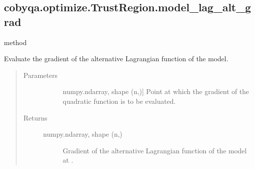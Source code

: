 \documentclass[letterpaper,10pt,english]{sphinxmanual}
\begin{document}
\begin{fulllineitems}
\begin{fulllineitems}
\begin{quote}
\begin{description}
\begin{description}
\end{description}

\end{description}\end{quote}

\end{fulllineitems}



\subsection{cobyqa.optimize.TrustRegion.model\_lag\_alt\_grad}
\label{\detokenize{refs/generated/cobyqa.optimize.TrustRegion.model_lag_alt_grad:cobyqa-optimize-trustregion-model-lag-alt-grad}}\label{\detokenize{refs/generated/cobyqa.optimize.TrustRegion.model_lag_alt_grad::doc}}
\sphinxAtStartPar
method

\begin{fulllineitems}
\label{\detokenize{refs/generated/cobyqa.optimize.TrustRegion.model_lag_alt_grad:cobyqa.optimize.TrustRegion.model_lag_alt_grad}}
\sphinxAtStartPar
Evaluate the gradient of the alternative Lagrangian function of the
model.
\begin{quote}\begin{description}
\item[{Parameters}] \leavevmode\begin{description}
\item[{}] \leavevmode{[}numpy.ndarray, shape (n,){]}
\sphinxAtStartPar
Point at which the gradient of the quadratic function is to be
evaluated.

\end{description}

\item[{Returns}] \leavevmode\begin{description}
\item[{numpy.ndarray, shape (n,)}] \leavevmode
\sphinxAtStartPar
Gradient of the alternative Lagrangian function of the model at .

\end{description}

\end{description}\end{quote}


\end{fulllineitems}
\end{fulllineitems}
\end{document}
